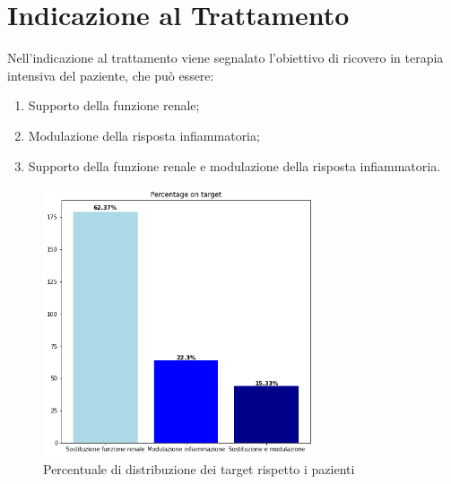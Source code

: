 \section{Indicazione al Trattamento}


Nell'indicazione al trattamento viene segnalato l'obiettivo di ricovero in terapia intensiva del paziente, che può essere:
\begin{enumerate}
	 \parsep
	\item Supporto della funzione renale;
	\item Modulazione della risposta infiammatoria;
	\item Supporto della funzione renale e modulazione della risposta infiammatoria.
\end{enumerate}

\begin{figure}[h]
	\includegraphics[width=8cm]{capitolo1/target.png}
	\centering
	\caption{Percentuale di distribuzione dei target rispetto i pazienti}
	\label{fig:target}
\end{figure}

